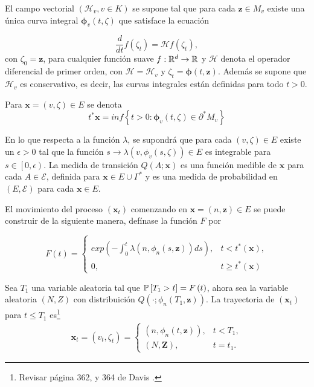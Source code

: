 El campo vectorial $\left(\mathcal{H}_{v},v\in K\right)$ se supone
tal que para cada $\mathbf{z}\in M_{v}$ existe una \'unica curva
integral $\mathbf{\phi}_{v}\left(t,\zeta\right)$ que satisface la
ecuaci\'on

\begin{equation}
\frac{d}{dt}f\left(\zeta_{t}\right)=\mathcal{H}f\left(\zeta_{t}\right),
\end{equation}
con $\zeta_{0}=\mathbf{z}$, para cualquier funci\'on suave
$f:\mathbb{R}^{d}\rightarrow\mathbb{R}$ y $\mathcal{H}$ denota el operador
diferencial de primer orden, con $\mathcal{H}=\mathcal{H}_{v}$ y
$\zeta_{t}=\mathbf{\phi}\left(t,\mathbf{z}\right)$. Adem\'as se
supone que $\mathcal{H}_{v}$ es conservativo, es decir, las curvas
integrales est\'an definidas para todo $t>0$.

Para $\mathbf{x}=\left(v,\zeta\right)\in E$ se denota
\[t^{*}\mathbf{x}=inf\left\{t>0:\mathbf{\phi}_{v}\left(t,\zeta\right)\in\partial^{*}M_{v}\right\}\]

En lo que respecta a la funci\'on $\lambda$, se supondr\'a que
para cada $\left(v,\zeta\right)\in E$ existe un $\epsilon>0$ tal
que la funci\'on
$s\rightarrow\lambda\left(v,\phi_{v}\left(s,\zeta\right)\right)\in
E$ es integrable para $s\in\left[0,\epsilon\right)$. La medida de
transici\'on $Q\left(A;\mathbf{x}\right)$ es una funci\'on medible
de $\mathbf{x}$ para cada $A\in\mathcal{E}$, definida para
$\mathbf{x}\in E\cup\Gamma^{*}$ y es una medida de probabilidad en
$\left(E,\mathcal{E}\right)$ para cada $\mathbf{x}\in E$.

El movimiento del proceso $\left(\mathbf{x}_{t}\right)$ comenzando
en $\mathbf{x}=\left(n,\mathbf{z}\right)\in E$ se puede construir
de la siguiente manera, def\'inase la funci\'on $F$ por

\begin{equation}
F\left(t\right)=\left\{\begin{array}{ll}\\
exp\left(-\int_{0}^{t}\lambda\left(n,\phi_{n}\left(s,\mathbf{z}\right)\right)ds\right), & t<t^{*}\left(\mathbf{x}\right),\\
0, & t\geq t^{*}\left(\mathbf{x}\right)
\end{array}\right.
\end{equation}

Sea $T_{1}$ una variable aleatoria tal que
$\mathbb{P}\left[T_{1}>t\right]=F\left(t\right)$, ahora sea la variable
aleatoria $\left(N,Z\right)$ con distribuici\'on
$Q\left(\cdot;\phi_{n}\left(T_{1},\mathbf{z}\right)\right)$. La
trayectoria de $\left(\mathbf{x}_{t}\right)$ para $t\leq T_{1}$
es\footnote{Revisar p\'agina 362, y 364 de Davis \cite{Davis}.}
\begin{eqnarray*}
\mathbf{x}_{t}=\left(v_{t},\zeta_{t}\right)=\left\{\begin{array}{ll}
\left(n,\phi_{n}\left(t,\mathbf{z}\right)\right), & t<T_{1},\\
\left(N,\mathbf{Z}\right), & t=t_{1}.
\end{array}\right.
\end{eqnarray*}

